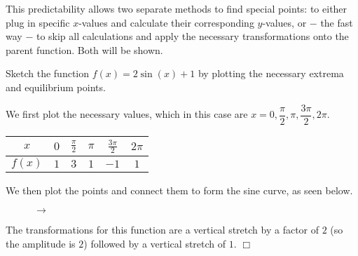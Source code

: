 \documentclass[../book.tex]{subfiles}
\begin{document}
This predictability allows two separate methods to find special points: to either plug in specific $x$-values and calculate their corresponding $y$-values, or $-$ the fast way $-$ to skip all calculations and apply the necessary transformations onto the parent function. Both will be shown.
\begin{example}
Sketch the function $f(x)=2\sin(x)+1$ by plotting the necessary extrema and equilibrium points.
\end{example}
\begin{solution}
We first plot the necessary values, which in this case are $x=0,\dfrac{\pi}{2},\pi,\dfrac{3\pi}{2},2\pi$.
\begin{table}[!ht]
    \centering
    \begin{tabular}{|c||c|c|c|c|c|}
        \toprule
        $x$ & $0$ & $\frac{\pi}{2}$ & $\pi$ & $\frac{3\pi}{2}$ & $2\pi$ \\
        \midrule
        $f(x)$ & $1$ & $3$ & $1$ & $-1$ & $1$ \\
        \bottomrule
    \end{tabular}
\end{table}

We then plot the points and connect them to form the sine curve, as seen below.
\begin{figure}[!ht]
    \centering
     $\to$ 
\end{figure}

The transformations for this function are a vertical stretch by a factor of $2$ (so the amplitude is $2$) followed by a vertical stretch of $1$. $\Box$
\end{solution}
\end{document}
